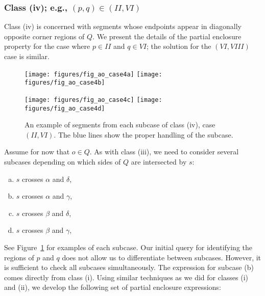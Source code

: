 \subsubsection{Class (iv); e.g., $(p, q) \in (II, VI)$}
\label{:rectanges:ao:class4}

Class (iv) is concerned with segments whose endpoints appear in diagonally opposite corner regions of $Q$. 
We present the details of the partial enclosure property for the case where $p \in II$ and $q \in VI$; the solution for the $(VI, VIII)$ case is similar.

\begin{figure}[t]
\begin{center}
  \texttt{[image: figures/fig\_ao\_case4a]}
  \hspace{1.0em}
  \texttt{[image: figures/fig\_ao\_case4b]}

  \vspace{2.0em}
  
  \texttt{[image: figures/fig\_ao\_case4c]}
  \hspace{1.0em}
  \texttt{[image: figures/fig\_ao\_case4d]}

  \caption[An example of a segment in class (iv), case $(II, VI)$.]{An example of segments from each subcase of class (iv), case $(II, VI)$. The blue lines show the proper handling of the subcase.}
  \label{fig:rectangles:ao:case4}
\end{center}
\end{figure}

Assume for now that $o \in Q$. As with class (iii), we need to consider several subcases depending on which sides of $Q$ are intersected by $s$:

\begin{enumerate}[(a)]
\item $s$ crosses $\alpha$ and $\delta$,
\item $s$ crosses $\alpha$ and $\gamma$,
\item $s$ crosses $\beta$ and $\delta$,
\item $s$ crosses $\beta$ and $\gamma$,
\end{enumerate}

See Figure~\ref{fig:rectangles:ao:case4} for examples of each subcase. 
Our initial query for identifying the regions of $p$ and $q$ does not allow us to differentiate between subcases. 
However, it is sufficient to check all subcases simultaneously. The expression for subcase (b) comes directly from class (i).
Using similar techniques as we did for classes (i) and (ii), we develop the following set of partial enclosure expressions:

